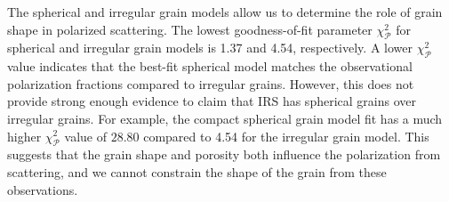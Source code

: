 
The spherical and irregular grain models allow us to determine the role of grain shape in polarized scattering. The lowest goodness-of-fit parameter $\chi_\mathcal{P}^2$ for spherical and irregular grain models is 1.37 and 4.54, respectively. A lower $\chi_\mathcal{P}^2$ value indicates that the best-fit spherical model matches the observational polarization fractions compared to irregular grains. However, this does not provide strong enough evidence to claim that IRS has spherical grains over irregular grains. For example, the compact spherical grain model fit has a much higher $\chi_\mathcal{P}^2$ value of $28.80$ compared to 4.54 for the irregular grain model. This suggests that the grain shape and porosity both influence the polarization from scattering, and we cannot constrain the shape of the grain from these observations. 



